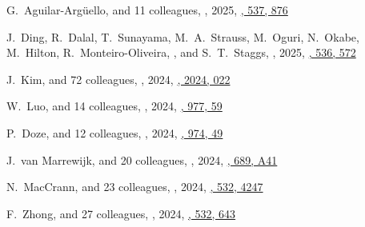 \begin{etaremune}
\item
G.~Aguilar-Arg\"uello, and 11 colleagues,
,
2025, \href{https://ui.adsabs.harvard.edu/abs/2025MNRAS.537..876A/abstract}{\mnras, 537, 876}

\item
J.~Ding, R.~Dalal, T.~Sunayama, M.~A.~Strauss, M.~Oguri, N.~Okabe, M.~Hilton, R.~Monteiro-Oliveira, \myself, and S.~T.~Staggs,
,
2025, \href{https://ui.adsabs.harvard.edu/abs/2025MNRAS.536..572D}{\mnras, 536, 572}
    
\item
J.~Kim, and 72 colleagues,
,
2024, \href{https://ui.adsabs.harvard.edu/abs/2024JCAP...12..022K}{\jcap, 2024, 022}
 
\item
W.~Luo, and 14 colleagues,
,
2024, \href{https://ui.adsabs.harvard.edu/abs/2024ApJ...977...59L}{\apj, 977, 59}

\item
P.~Doze, and 12 colleagues,
,
2024, \href{https://ui.adsabs.harvard.edu/abs/2024ApJ...974...49D}{\apj, 974, 49}

\item
J.~van Marrewijk, and 20 colleagues,
,
2024, \href{https://ui.adsabs.harvard.edu/abs/2024A&A...689A..41V}{\aap, 689, A41}

\item
N.~MacCrann, and 23 colleagues,
,
2024, \href{https://ui.adsabs.harvard.edu/abs/2024MNRAS.532.4247M}{\mnras, 532, 4247}

\item
F.~Zhong, and 27 colleagues,
,
2024, \href{https://ui.adsabs.harvard.edu/abs/2024MNRAS.532..643Z}{\mnras, 532, 643}


\end{etaremune}
